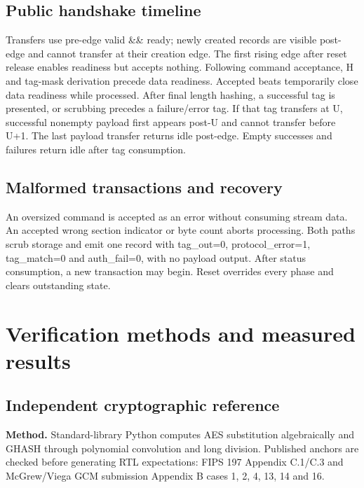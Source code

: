 \documentclass[11pt,a4paper]{article}
\begin{document}
\subsection{Public handshake timeline}

Transfers use pre-edge valid \&\& ready; newly created records are visible post-edge and cannot transfer at their creation edge. The first rising edge after reset release enables readiness but accepts nothing. Following command acceptance,\allowbreak{} H and tag-mask derivation precede data readiness. Accepted beats temporarily close data readiness while processed. After final length hashing,\allowbreak{} a successful tag is presented,\allowbreak{} or scrubbing precedes a failure/\allowbreak{}error tag. If that tag transfers at U,\allowbreak{} successful nonempty payload first appears post-U and cannot transfer before U+\allowbreak{}1. The last payload transfer returns idle post-edge. Empty successes and failures return idle after tag consumption.

\subsection{Malformed transactions and recovery}

An oversized command is accepted as an error without consuming stream data. An accepted wrong section indicator or byte count aborts processing. Both paths scrub storage and emit one record with tag\_\allowbreak{}out=\allowbreak{}0,\allowbreak{} protocol\_\allowbreak{}error=\allowbreak{}1,\allowbreak{} tag\_\allowbreak{}match=\allowbreak{}0 and auth\_\allowbreak{}fail=\allowbreak{}0,\allowbreak{} with no payload output. After status consumption,\allowbreak{} a new transaction may begin. Reset overrides every phase and clears outstanding state.

\section{Verification methods and measured results}

\subsection{Independent cryptographic reference}

\textbf{Method.} Standard-library Python computes AES substitution algebraically and GHASH through polynomial convolution and long division. Published anchors are checked before generating RTL expectations: FIPS 197 Appendix C.1/\allowbreak{}C.3 and McGrew/\allowbreak{}Viega GCM submission Appendix B cases 1,\allowbreak{} 2,\allowbreak{} 4,\allowbreak{} 13,\allowbreak{} 14 and 16.
\end{document}
